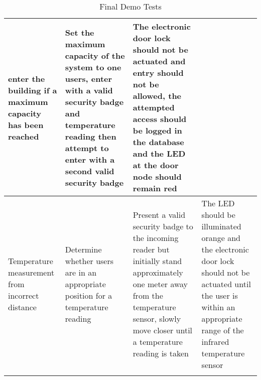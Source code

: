 \begin{longtable}[htb]{>{\centering\arraybackslash}m{3cm}|>{\centering\arraybackslash}m{3.5cm}|>{\centering\arraybackslash}m{3cm}|>{\centering\arraybackslash}m{3.5cm}}
enter the building if a maximum capacity has been reached & Set the maximum
capacity of the system to one users, enter with a valid security badge and
temperature reading then attempt to enter with a second valid security badge &
The electronic door lock should not be actuated and entry should not be allowed,
the attempted access should be logged in the database and the LED at the door
node should remain red \\
\hline
Temperature measurement from incorrect distance & Determine whether users are in
an appropriate position for a temperature reading & Present a valid security
badge to the incoming reader but initially stand approximately one meter away
from the temperature sensor, slowly move closer until a temperature reading is
taken & The LED should be illuminated orange and the electronic door lock should
not be actuated until the user is within an appropriate range of the infrared
temperature sensor \\
\bottomrule
\caption{Final Demo Tests}
\label{table:final-tests}
\end{longtable}


